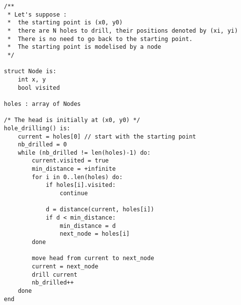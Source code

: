 \documentclass[11pt]{article}
\begin{document}
\begin{lstlisting}
/**
 * Let's suppose :
 *	the starting point is (x0, y0)
 *	there are N holes to drill, their positions denoted by (xi, yi) 
 *	There is no need to go back to the starting point.
 *	The starting point is modelised by a node
 */

struct Node is:
	int x, y
	bool visited

holes : array of Nodes

/* The head is initially at (x0, y0) */
hole_drilling() is:
	current = holes[0] // start with the starting point
	nb_drilled = 0
	while (nb_drilled != len(holes)-1) do:
		current.visited = true
		min_distance = +infinite
		for i in 0..len(holes) do:
			if holes[i].visited:
				continue

			d = distance(current, holes[i])
			if d < min_distance:
				min_distance = d
				next_node = holes[i]
		done

		move head from current to next_node
		current = next_node
		drill current
		nb_drilled++
	done
end
\end{lstlisting}

\newpage
\end{document}
